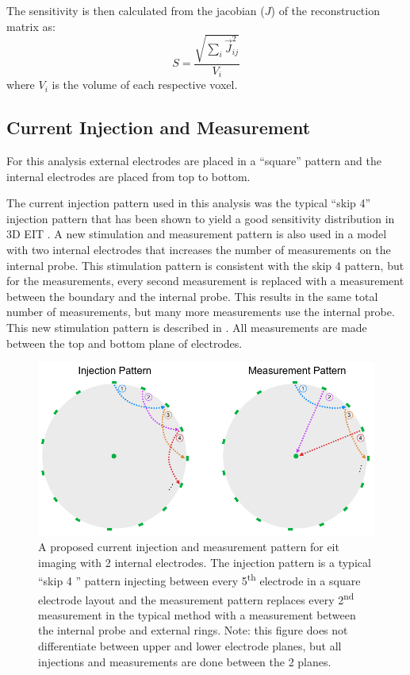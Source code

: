 The sensitivity is then calculated from the jacobian ($J$) of the reconstruction matrix as:
\begin{equation}
	S = \frac{\sqrt{\sum_{i}\vec{J}_{ij}^2}}{V_i}
\end{equation}
where $V_i$ is the volume of each respective voxel. 

\subsection{Current Injection and Measurement}
For this analysis external electrodes are placed in 
a ``square'' pattern \parencite{grychtol_3d_2016} 
and the internal electrodes are placed from top to 
bottom. 

The current injection pattern used in this analysis was the 
typical ``skip 4'' injection pattern that has been shown to yield 
a good sensitivity distribution in 3D EIT \parencite{grychtol_3d_2016}.
A new stimulation and measurement pattern is also used in a model with 
two internal electrodes that increases
the number of measurements on the internal probe. This stimulation 
pattern is consistent with the skip 4 pattern, but 
for the measurements, every second measurement
is replaced with a measurement between the boundary and the internal probe. 
This results in the same total number of measurements, but many more measurements
use the internal probe. This new stimulation pattern is described in . 
All measurements are made between the top and bottom plane of electrodes.

\begin{figure}
\centering
\includegraphics[width=\textwidth]{chapter6-internal_electrodes/imgs/current_injection.pdf}
\caption[Current injection patterns with internal electrodes]{A proposed current injection and measurement pattern for \acrshort{eit} imaging with 2 internal electrodes.
The injection pattern is a typical ``skip 4 '' pattern injecting between every 5\textsuperscript{th} electrode in a square electrode layout and the
measurement pattern replaces every 2\textsuperscript{nd} measurement in the typical method with a measurement between the internal probe and
external rings. Note: this figure does not differentiate between upper and lower electrode planes, but all injections and measurements are done between 
the 2 planes.}
\label{fig:modified_measurement}
\end{figure}

